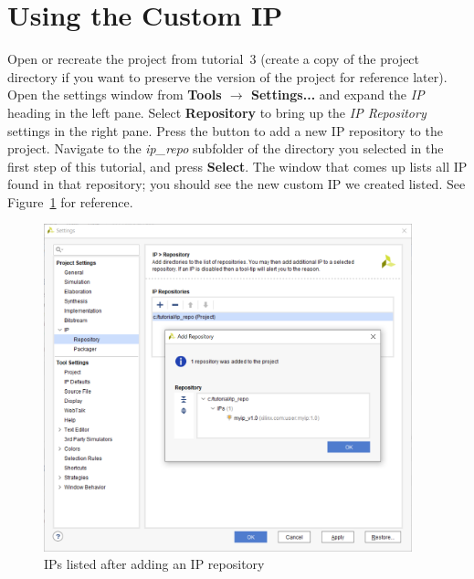 \documentclass[11pt]{article}
\begin{document}
\section{Using the Custom IP}
\label{sec:using_ip}
Open or recreate the project from tutorial~3 (create a copy of the project directory if you want to preserve the version of the project for reference later). Open the settings window from \textbf{Tools $\rightarrow$ Settings...} and expand the \textit{IP} heading in the left pane. Select \textbf{Repository} to bring up the \textit{IP Repository} settings in the right pane. Press the 
button to add a new IP repository to the project. Navigate to the \textit{ip\_repo} subfolder of the directory you selected in the first step of this tutorial, and press \textbf{Select}. The window that comes up lists all IP found in that repository; you should see the new custom IP we created listed. See Figure~\ref{fig:ip_repo_added} for reference.

\begin{figure}[!h]
    \centering
    \includegraphics[width=0.95\textwidth]{images/ip_repo_added.png}
    \caption{IPs listed after adding an IP repository}
    \label{fig:ip_repo_added}
\end{figure}
\end{document}
